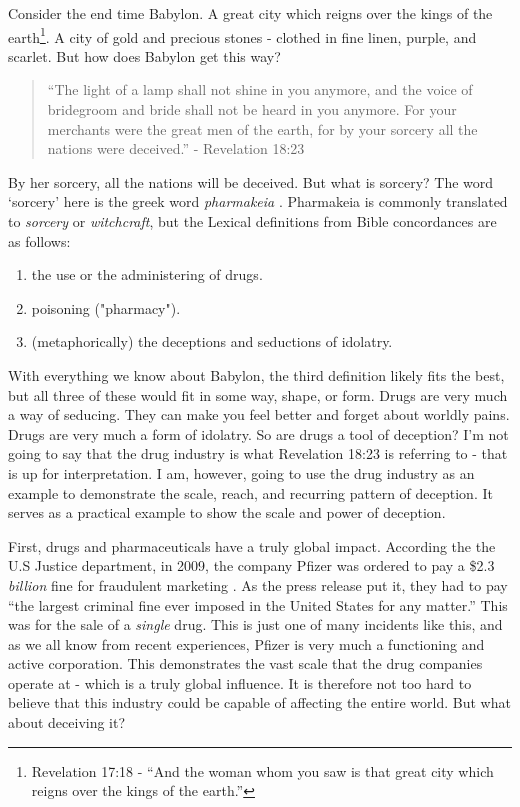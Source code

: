 \documentclass[10pt]{article}
\begin{document}
\begin{multicols}{2}
Consider the end time Babylon. A great city which reigns over the kings of the earth\footnote{Revelation 17:18 - ``And the woman whom you saw is that great city which reigns over the kings of the earth.''}. A city of gold and precious stones - clothed in fine linen, purple, and scarlet. But how does Babylon get this way?

\begin{quotation}
``The light of a lamp shall not shine in you anymore, and the voice of bridegroom and bride shall not be heard in you anymore. For your merchants were the great men of the earth, for by your sorcery all the nations were deceived.'' - Revelation 18:23
\end{quotation}

By her sorcery, all the nations will be deceived. But what is sorcery? The word `sorcery' here is the greek word \textit{pharmakeia} \cite{pharmakeia}. Pharmakeia is commonly translated to \textit{sorcery} or \textit{witchcraft}, but the Lexical definitions from Bible concordances are as follows:
\begin{enumerate}\itemsep0em 
\item the use or the administering of drugs.
\item poisoning ("pharmacy").
\item (metaphorically) the deceptions and seductions of idolatry.
\end{enumerate}
With everything we know about Babylon, the third definition likely fits the best, but all three of these would fit in some way, shape, or form. Drugs are very much a way of seducing. They can make you feel better and forget about worldly pains. Drugs are very much a form of idolatry. So are drugs a tool of deception? I'm not going to say that the drug industry is what  Revelation 18:23 is referring to - that is up for interpretation. I am, however, going to use the drug industry as an example to demonstrate the scale, reach, and recurring pattern of deception. It serves as a practical example to show the scale and power of deception.

First, drugs and pharmaceuticals have a truly global impact. According the the U.S Justice department, in 2009, the company Pfizer was ordered to pay a \$2.3 \textit{billion} fine for fraudulent marketing \cite{pfizer_fine}. As the press release put it, they had to pay ``the largest criminal fine ever imposed in the United States for any matter.'' This was for the sale of a \textit{single} drug. This is just one of many incidents like this, and as we all know from recent experiences, Pfizer is very much a functioning and active corporation. This demonstrates the vast scale that the drug companies operate at - which is a truly global influence. It is therefore not too hard to believe that this industry could be capable of affecting the entire world. But what about deceiving it?


\end{multicols}
\end{document}
